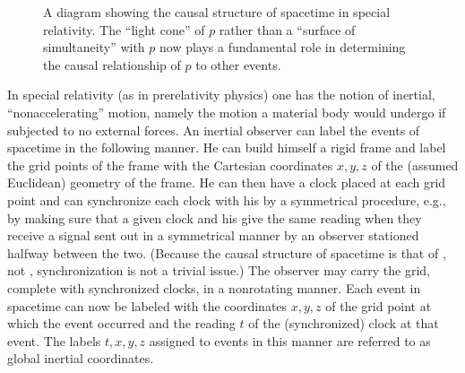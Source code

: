 \begin{figure}[!ht]
\begin{minipage}{.32\textwidth}
    \caption{A diagram showing the causal structure of spacetime in special relativity. The ``light cone'' of $p$ rather than a ``surface of simultaneity'' with $p$ now plays a fundamental role in determining the causal relationship of $p$ to other events.}
    \label{1.2}
\end{minipage}
\hfill
\begin{minipage}{.64\textwidth}
    \centering
\end{minipage}
\end{figure}

In special relativity (as in prerelativity physics) one has the notion of inertial, ``nonaccelerating'' motion, namely the motion a material body would undergo if subjected to no external forces. An inertial observer can label the events of spacetime in the following manner. He can build himself a rigid frame and label the grid points of the frame with the Cartesian coordinates $x, y, z$ of the (assumed Euclidean) geometry of the frame. He can then have a clock placed at each grid point and can synchronize each clock with his by a symmetrical procedure, e.g., by making sure that a given clock and his give the same reading when they receive a signal sent out in a symmetrical manner by an observer stationed halfway between the two. (Because the causal structure of spacetime is that of , not , synchronization is not a trivial issue.) The observer may carry the grid, complete with synchronized clocks, in a nonrotating manner. Each event in spacetime can now be labeled with the coordinates $x, y, z$ of the grid point at which the event occurred and the reading $t$ of the (synchronized) clock at that event. The labels $t, x, y, z$ assigned to events in this manner are referred to as global inertial coordinates. 

